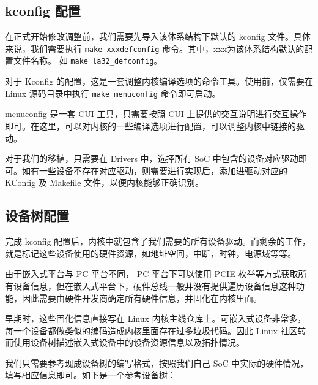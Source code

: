 \subsection{kconfig 配置}\label{sec:13-operating-system-012}

在正式开始修改调整前，我们需要先导入该体系结构下默认的 kconfig 文件。具体来说，我们需要执行 \texttt{make\ xxxdefconfig} 命令。其中，xxx为该体系结构默认的配置文件名称。
如 \texttt{make\ la32\_defconfig}。

对于 Kconfig 的配置，这是一套调整内核编译选项的命令工具。使用前，仅需要在 Linux 源码目录中执行 \texttt{make\ menuconfig} 命令即可启动。

menuconfig 是一套 CUI 工具，只需要按照 CUI 上提供的交互说明进行交互操作即可。在这里，可以对内核的一些编译选项进行配置，可以调整内核中链接的驱动。

对于我们的移植，只需要在 Drivers 中，选择所有 SoC 中包含的设备对应驱动即可。如有一些设备不存在对应驱动，则需要进行实现后，添加进驱动对应的 KConfig 及 Makefile 文件，以便内核能够正确识别。

\subsection{设备树配置}\label{sec:13-operating-system-013}

完成 kconfig 配置后，内核中就包含了我们需要的所有设备驱动。而剩余的工作，就是标记这些设备使用的硬件资源，如地址空间，中断，时钟，电源域等等。

由于嵌入式平台与 PC 平台不同， PC 平台下可以使用 PCIE 枚举等方式获取所有设备信息，但在嵌入式平台下，硬件总线一般并没有提供遍历设备信息这种功能，因此需要由硬件开发商确定所有硬件信息，并固化在内核里面。

早期时，这些固化信息直接写在 Linux 内核主线仓库上。可嵌入式设备非常多，每一个设备都做类似的编码造成内核里面存在过多垃圾代码。因此 Linux 社区转而使用设备树描述嵌入式设备中的设备资源信息以及拓扑情况。

我们只需要参考现成设备树的编写格式，按照我们自己 SoC 中实际的硬件情况，填写相应信息即可。如下是一个参考设备树：

